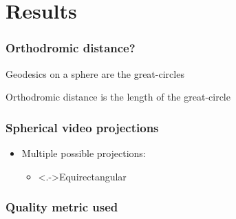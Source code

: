 \section{Results}

\begin{frame}[c]
   \frametitle{Orthodromic distance?}

   Geodesics on a sphere are the great-circles

   Orthodromic distance is the length of the great-circle

   \begin{independentCounter}
      
   \end{independentCounter}

\end{frame}

\begin{frame}[c]
   \frametitle{Spherical video projections}

   \vfill

   \begin{itemize}
      \item<+-> Multiple possible projections:
      \begin{itemize}
         \item \uncover<.->{Equirectangular}
      \end{itemize}
   \end{itemize}

   \vfill

   \begin{independentCounter}
      
   \end{independentCounter}

\end{frame}

\begin{frame}[c]
   \frametitle{Quality metric used}

   \begin{independentCounter}
   \end{independentCounter}
\end{frame}

